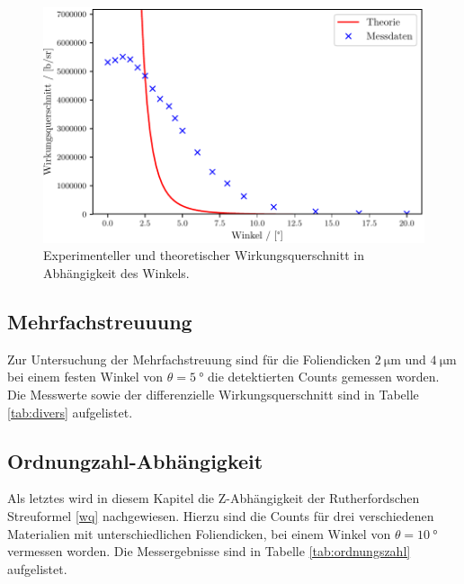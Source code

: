 \begin{figure}
  \centering
  \includegraphics{build/Wirkungsquerschnitt.pdf}
  \caption{Experimenteller und theoretischer Wirkungsquerschnitt in Abhängigkeit des Winkels.}
  \label{fig:Wirkungsquerschnitt1}
\end{figure}


\subsection{Mehrfachstreuuung}
\label{sec:Mehrfachstreuung}
Zur Untersuchung der Mehrfachstreuung sind für die Foliendicken $\SI{2}{\micro\meter}$ und $\SI{4}{\micro\meter}$ bei einem festen Winkel von $\theta=\SI{5}{\degree}$ die detektierten Counts gemessen worden. Die Messwerte sowie der differenzielle Wirkungsquerschnitt sind in Tabelle \ref{tab:divers} aufgelistet.




\subsection{Ordnungzahl-Abhängigkeit}
Als letztes wird in diesem Kapitel die Z-Abhängigkeit der Rutherfordschen Streuformel \ref{wq} nachgewiesen. Hierzu sind die Counts für drei verschiedenen Materialien mit unterschiedlichen Foliendicken, bei einem Winkel von $\theta=\SI{10}{\degree}$ vermessen worden. Die Messergebnisse sind in Tabelle \ref{tab:ordnungszahl} aufgelistet. 


